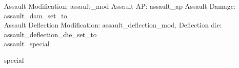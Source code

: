 
Assault Modification: {assault_mod} Assault AP: {assault_ap} Assault Damage: {assault_dam_set_to}\\
Assault Deflection Modification: {assault_deflection_mod}, Deflection die: {assault_deflection_die_set_to} \\
{assault_special}

{special}



